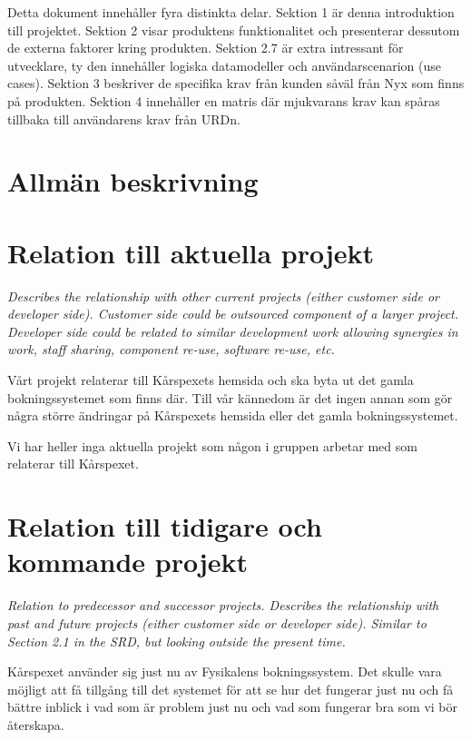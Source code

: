 \documentclass[a4paper, twoside, 11pt, titlepage]{article}
\begin{document}
Detta dokument innehåller fyra distinkta delar. Sektion 1 är denna introduktion till projektet. Sektion 2 visar produktens funktionalitet och presenterar dessutom de externa faktorer kring produkten. Sektion 2.7 är extra intressant för utvecklare, ty den innehåller logiska datamodeller och användarscenarion (use cases).  Sektion 3 beskriver de specifika krav från kunden såväl från Nyx som finns på produkten. Sektion 4 innehåller en matris där mjukvarans krav kan spåras tillbaka till användarens krav från URDn.

\clearpage
\section{Allmän beskrivning}



\clearpage
\section{Relation till aktuella projekt}


\emph{Describes the relationship with other current projects (either customer side or developer side). Customer side could be outsourced component of a larger project. Developer side could be related to similar development work allowing synergies in work, staff sharing, component re-use, software re-use, etc.}

Vårt projekt relaterar till Kårspexets hemsida och ska byta ut det gamla bokningssystemet som finns där. Till vår kännedom är det ingen annan som gör några större ändringar på Kårspexets hemsida eller det gamla bokningssystemet.

Vi har heller inga aktuella projekt som någon i gruppen arbetar med som relaterar till Kårspexet.

\clearpage
\section{Relation till tidigare och kommande projekt}


\emph{Relation to predecessor and successor projects. Describes the relationship with past and future projects (either customer side or developer side). Similar to Section 2.1 in the SRD, but looking outside the present time.}

Kårspexet använder sig just nu av Fysikalens bokningssystem. Det skulle vara möjligt att få tillgång till det systemet för att se hur det fungerar just nu och få bättre inblick i vad som är problem just nu och vad som fungerar bra som vi bör återskapa.
\end{document}
